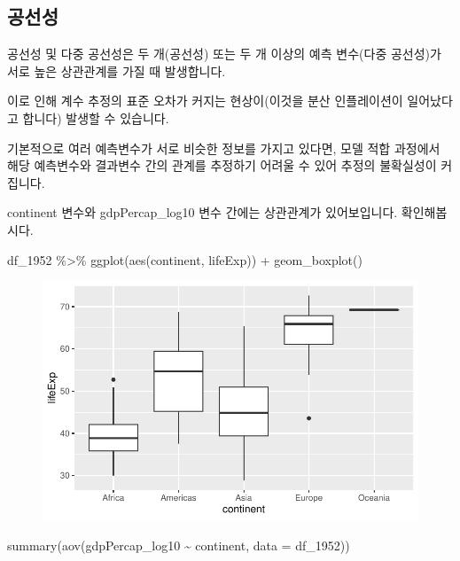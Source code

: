 \documentclass[
  letterpaper,
  DIV=11,
  numbers=noendperiod]{scrartcl}
\newenvironment{Shaded}{\begin{snugshade}}{\end{snugshade}}
\newcommand{\AttributeTok}[1]{\textcolor[rgb]{0.40,0.45,0.13}{#1}}
\newcommand{\FunctionTok}[1]{\textcolor[rgb]{0.28,0.35,0.67}{#1}}
\newcommand{\NormalTok}[1]{\textcolor[rgb]{0.00,0.23,0.31}{#1}}
\newcommand{\SpecialCharTok}[1]{\textcolor[rgb]{0.37,0.37,0.37}{#1}}
\begin{document}
\hypertarget{uxacf5uxc120uxc131}{%
\subsection{공선성}\label{uxacf5uxc120uxc131}}

공선성 및 다중 공선성은 두 개(공선성) 또는 두 개 이상의 예측 변수(다중
공선성)가 서로 높은 상관관계를 가질 때 발생합니다.

이로 인해 계수 추정의 표준 오차가 커지는 현상이(이것을 분산 인플레이션이
일어났다고 합니다) 발생할 수 있습니다.

기본적으로 여러 예측변수가 서로 비슷한 정보를 가지고 있다면, 모델 적합
과정에서 해당 예측변수와 결과변수 간의 관계를 추정하기 어려울 수 있어
추정의 불확실성이 커집니다.

continent 변수와 gdpPercap\_log10 변수 간에는 상관관계가 있어보입니다.
확인해봅시다.

\begin{Shaded}
\begin{Highlighting}[]
\NormalTok{df\_1952 }\SpecialCharTok{\%\textgreater{}\%}
  \FunctionTok{ggplot}\NormalTok{(}\FunctionTok{aes}\NormalTok{(continent, lifeExp)) }\SpecialCharTok{+}
  \FunctionTok{geom\_boxplot}\NormalTok{()}
\end{Highlighting}
\end{Shaded}

\begin{figure}[H]

{\centering \includegraphics{LinearRegression_files/figure-pdf/unnamed-chunk-17-1.pdf}

}

\end{figure}

\begin{Shaded}
\begin{Highlighting}[]
\FunctionTok{summary}\NormalTok{(}\FunctionTok{aov}\NormalTok{(gdpPercap\_log10 }\SpecialCharTok{\textasciitilde{}}\NormalTok{ continent, }\AttributeTok{data =}\NormalTok{ df\_1952))}
\end{Highlighting}
\end{Shaded}
\end{document}
